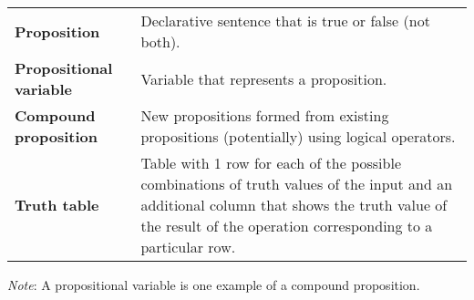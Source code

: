 
\begin{tabular}{lp{5in}}
    {\bf Proposition} & Declarative sentence that is true or false (not both).\\
    {\bf Propositional variable} & Variable that represents a proposition.\\
    {\bf Compound proposition}& New propositions formed from existing propositions (potentially) using logical operators.\\
    {\bf Truth table}& Table with 1 row for each of the possible combinations of truth values of the input and 
    an additional column that shows the truth value of the result of the operation corresponding to a particular row.
    \end{tabular}
    
    {\it Note}: A propositional variable is one example of a compound proposition.